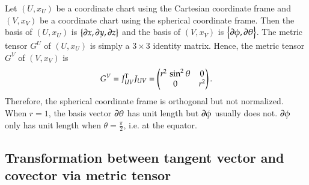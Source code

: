 \documentclass[11pt, a4paper]{book}
\begin{document}
\begin{Example}
  \label{exam:spherical-coordinate-metric-tensor}
  Let $(U,x_U)$ be a coordinate chart using the Cartesian coordinate frame and $(V,x_V)$
  be a coordinate chart using the spherical coordinate frame. Then the basis of $(U,x_U)$
  is $\left\{ \boldsymbol{\partial}x, \boldsymbol{\partial}y, \boldsymbol{\partial}z \right\}$ and the basis of
  $(V,x_V)$ is $\left\{ \boldsymbol{\partial}\phi, \boldsymbol{\partial}\theta \right\}$. The metric
  tensor $G^U$ of $(U,x_U)$ is simply a $3\times 3$ identity matrix. Hence, the metric
  tensor $G^V$ of $(V,x_V)$ is
  \begin{equation}
    \label{eq:spherical-coordinate-metric-tensor}
    G^V = J_{UV}^{\mathrm{T}} J_{UV} = \ifx\endpmatrix\undefined\pmatrix{\else\begin{pmatrix}\fi r^2\,
        \sin ^2\theta&0\cr 0&r^2\cr 
        \ifx\endpmatrix\undefined}\else\end{pmatrix}\fi.
  \end{equation}
  Therefore, the spherical coordinate frame is orthogonal but not normalized. When $r=1$,
  the basis vector $\boldsymbol{\partial}\theta$ has unit length but $\boldsymbol{\partial}\phi$ usually
  does not. $\boldsymbol{\partial}\phi$ only has unit length when $\theta=\frac{\pi}{2}$, i.e. at
  the equator.
\end{Example}

\subsection{Transformation between tangent vector and covector via metric tensor}
\end{document}
